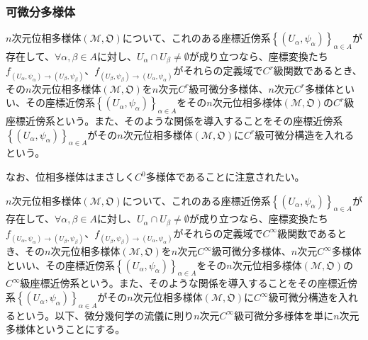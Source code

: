 \documentclass[dvipdfmx]{jsarticle}
\begin{document}
\subsubsection{可微分多様体}%
\begin{dfn}
$n$次元位相多様体$\left( \mathcal{M},\mathfrak{O} \right)$について、これのある座標近傍系$\left\{ \left( U_{\alpha},\psi_{\alpha} \right) \right\}_{\alpha \in A}$が存在して、$\forall\alpha,\beta \in A$に対し、$U_{\alpha} \cap U_{\beta} \neq \emptyset$が成り立つなら、座標変換たち$f_{\left( U_{\alpha},\psi_{\alpha} \right) \rightarrow \left( U_{\beta},\psi_{\beta} \right)}$、$f_{\left( U_{\beta},\psi_{\beta} \right) \rightarrow \left( U_{\alpha},\psi_{\alpha} \right)}$がそれらの定義域で$C^{r}$級関数であるとき、その$n$次元位相多様体$\left( \mathcal{M},\mathfrak{O} \right)$を$n$次元$C^{r}$級可微分多様体、$n$次元$C^{r}$多様体といい、その座標近傍系$\left\{ \left( U_{\alpha},\psi_{\alpha} \right) \right\}_{\alpha \in A}$をその$n$次元位相多様体$\left( \mathcal{M},\mathfrak{O} \right)$の$C^{r}$級座標近傍系という。また、そのような関係を導入することをその座標近傍系$\left\{ \left( U_{\alpha},\psi_{\alpha} \right) \right\}_{\alpha \in A}$がその$n$次元位相多様体$\left( \mathcal{M},\mathfrak{O} \right)$に$C^{r}$級可微分構造を入れるという。
\end{dfn}\par
なお、位相多様体はまさしく$C^{0}$多様体であることに注意されたい。
\begin{dfn}
$n$次元位相多様体$\left( \mathcal{M},\mathfrak{O} \right)$について、これのある座標近傍系$\left\{ \left( U_{\alpha},\psi_{\alpha} \right) \right\}_{\alpha \in A}$が存在して、$\forall\alpha,\beta \in A$に対し、$U_{\alpha} \cap U_{\beta} \neq \emptyset$が成り立つなら、座標変換たち$f_{\left( U_{\alpha},\psi_{\alpha} \right) \rightarrow \left( U_{\beta},\psi_{\beta} \right)}$、$f_{\left( U_{\beta},\psi_{\beta} \right) \rightarrow \left( U_{\alpha},\psi_{\alpha} \right)}$がそれらの定義域で$C^{\infty}$級関数であるとき、その$n$次元位相多様体$\left( \mathcal{M},\mathfrak{O} \right)$を$n$次元$C^{\infty}$級可微分多様体、$n$次元$C^{\infty}$多様体といい、その座標近傍系$\left\{ \left( U_{\alpha},\psi_{\alpha} \right) \right\}_{\alpha \in A}$をその$n$次元位相多様体$\left( \mathcal{M},\mathfrak{O} \right)$の$C^{\infty}$級座標近傍系という。また、そのような関係を導入することをその座標近傍系$\left\{ \left( U_{\alpha},\psi_{\alpha} \right) \right\}_{\alpha \in A}$がその$n$次元位相多様体$\left( \mathcal{M},\mathfrak{O} \right)$に$C^{\infty}$級可微分構造を入れるという。以下、微分幾何学の流儀に則り$n$次元$C^{\infty}$級可微分多様体を単に$n$次元多様体ということにする。
\end{dfn}
\end{document}
